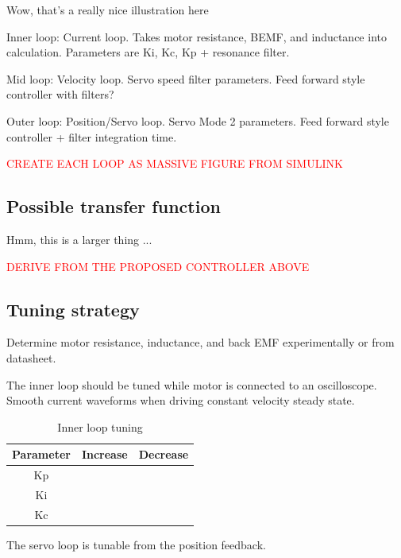Wow, that's a really nice illustration here

Inner loop: Current loop. Takes motor resistance, BEMF, and inductance into calculation. Parameters are Ki, Kc, Kp + resonance filter. 

Mid loop: Velocity loop. Servo speed filter parameters. Feed forward style controller with filters?

Outer loop: Position/Servo loop. Servo Mode 2 parameters. Feed forward style controller + filter integration time.

\textcolor{red}{CREATE EACH LOOP AS MASSIVE FIGURE FROM SIMULINK}

\subsection{Possible transfer function}

Hmm, this is a larger thing ...

\textcolor{red}{DERIVE FROM THE PROPOSED CONTROLLER ABOVE}

\subsection{Tuning strategy}

Determine motor resistance, inductance, and back EMF experimentally or from datasheet. 

The inner loop should be tuned while motor is connected to an oscilloscope. Smooth current waveforms when driving constant velocity steady state. 

\begin{table}[H]
	\centering
	\begin{tabular}{|c|c|c|}
		\hline
		\textbf{Parameter} & \textbf{Increase} & \textbf{Decrease} \\
		\hline
		Kp &  &  \\
		\hline
		Ki &  &  \\
		\hline
		Kc &  &  \\
		\hline
	\end{tabular}
	\caption{Inner loop tuning}
	\label{tab:controller_tuning_inner}
\end{table}

The servo loop is tunable from the position feedback. 

